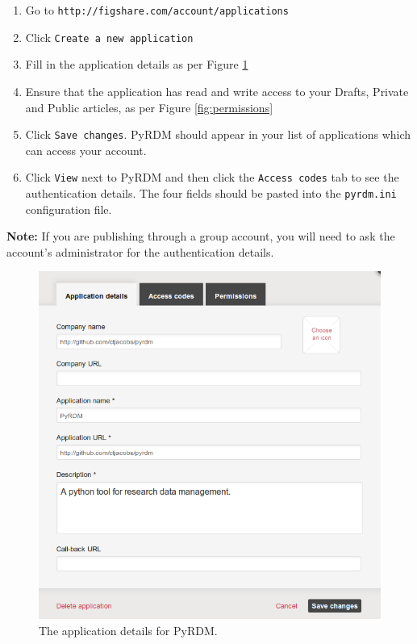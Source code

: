 \documentclass[a4paper,11pt]{report}
\begin{document}
\begin{enumerate}
  \item Go to \texttt{http://figshare.com/account/applications}
  \item Click \texttt{Create a new application}
  \item Fill in the application details as per Figure \ref{fig:application_details}
  \item Ensure that the application has read and write access to your Drafts, Private and Public articles, as per Figure \ref{fig:permissions}
  \item Click \texttt{Save changes}. PyRDM should appear in your list of applications which can access your account.
  \item Click \texttt{View} next to PyRDM and then click the \texttt{Access codes} tab to see the authentication details. The four fields should be pasted into the \texttt{pyrdm.ini} configuration file.
\end{enumerate}

\textbf{Note:} If you are publishing through a group account, you will need to ask the account's administrator for the authentication details.

\begin{figure}
  \centering
  \includegraphics[width=1\columnwidth]{images/application_details.png}
  \caption{The application details for PyRDM.}
  \label{fig:application_details}
\end{figure}
\end{document}
